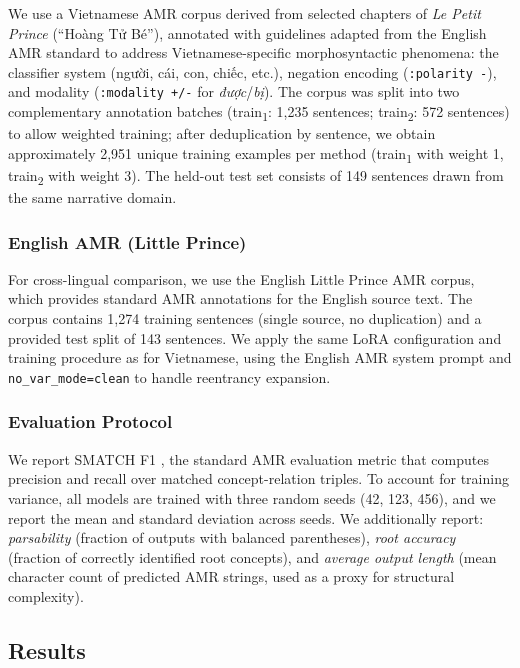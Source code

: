 \documentclass[11pt,a4paper]{article}
\begin{document}
We use a Vietnamese AMR corpus derived from selected chapters of \textit{Le Petit
Prince} (``Hoàng Tử Bé''), annotated with guidelines adapted from the English
AMR standard to address Vietnamese-specific morphosyntactic phenomena: the
classifier system (người, cái, con, chiếc, etc.), negation encoding (\texttt{:polarity -}),
and modality (\texttt{:modality +/-} for \textit{được}/\textit{bị}).
The corpus was split into two complementary annotation batches
(train\textsubscript{1}: 1,235 sentences; train\textsubscript{2}: 572 sentences)
to allow weighted training; after deduplication by sentence, we obtain
approximately 2,951 unique training examples per method (train\textsubscript{1}
with weight 1, train\textsubscript{2} with weight 3). The held-out test set
consists of 149 sentences drawn from the same narrative domain.

\subsubsection{English AMR (Little Prince)}

For cross-lingual comparison, we use the English Little Prince AMR corpus, which
provides standard AMR annotations for the English source text. The corpus
contains 1,274 training sentences (single source, no duplication) and a
provided test split of 143 sentences. We apply the same LoRA configuration and
training procedure as for Vietnamese, using the English AMR system prompt and
\texttt{no\_var\_mode=clean} to handle reentrancy expansion.

\subsubsection{Evaluation Protocol}

We report SMATCH F1 \citep{cai2013smatch}, the standard AMR evaluation metric
that computes precision and recall over matched concept-relation triples.
To account for training variance, all models are trained with three random
seeds (42, 123, 456), and we report the mean and standard deviation across
seeds. We additionally report: \emph{parsability} (fraction of outputs with
balanced parentheses), \emph{root accuracy} (fraction of correctly identified
root concepts), and \emph{average output length} (mean character count of
predicted AMR strings, used as a proxy for structural complexity).

\subsection{Results}
\label{sec:results}
\end{document}
